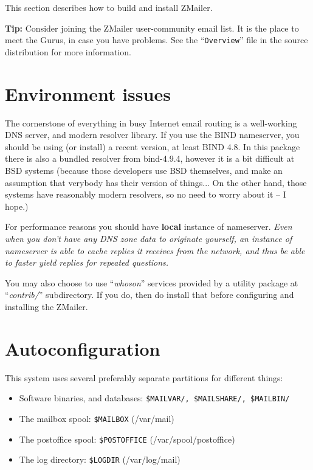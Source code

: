 
This section describes how to build and install ZMailer.

{\bf Tip:} Consider joining the ZMailer user-community email list.
It is the place to meet the Gurus, in case you have problems.
See the ``{\tt Overview}'' file in the source distribution for more
information.

\section{Environment issues}%

The cornerstone of everything in busy Internet email routing
is a well-working DNS server, and modern resolver library.
If you use the BIND nameserver, you should be using (or install)
a recent version, at least BIND 4.8. In this package there is also 
a bundled resolver from  bind-4.9.4, however it is a bit difficult
at BSD systems (because those developers use BSD themselves, and
make an assumption that verybody has their version of things...
On the other hand, those systems have reasonably modern resolvers,
so no need to worry about it -- I hope.) 

For performance reasons you should have {\bf local} instance of
nameserver. {\em Even when you don't have any DNS zone data to
originate yourself, an instance of nameserver is able to cache
replies it receives from the network, and thus be able to faster
yield replies for repeated questions.}


You may also choose to use ``{\em whoson}'' services provided by
a utility package at ``{\em contrib/}'' subdirectory.  If you do,
then do install that before configuring and installing the ZMailer.

\section{Autoconfiguration}%
%

This system uses several preferably separate partitions for
different things:%
%

\begin{itemize}
\item Software binaries, and databases: {\tt \$MAILVAR/, \$MAILSHARE/, \$MAILBIN/}
\item The mailbox spool: {\tt \$MAILBOX} (/var/mail)
\item The postoffice spool: {\tt \$POSTOFFICE} (/var/spool/postoffice)
\item The log directory: {\tt \$LOGDIR} (/var/log/mail)
\end{itemize}

